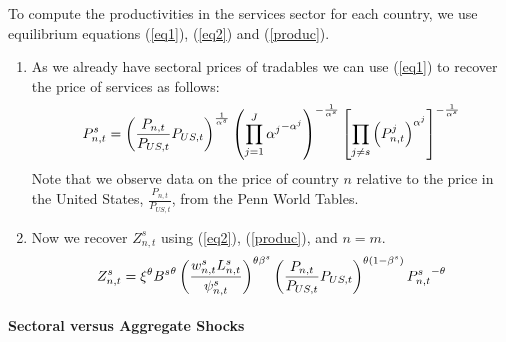 \documentclass[12pt]{article}
\begin{document}
To compute the productivities in the services sector for each country, we
use equilibrium equations (\ref{eq1}), (\ref{eq2}) and (\ref{produc}).

\begin{enumerate}
\item As we already have sectoral prices of tradables we can use (\ref{eq1})
to recover the price of services as follows: 
\begin{equation}
P_{n,t}^{s}=\left( \frac{P_{n,t}}{P_{US,t}}P_{US,t}\right) ^{\frac{1}{\alpha
^{s}}}\left( \prod_{j=1}^{J}{\alpha ^{j}}^{-\alpha ^{j}}\right) ^{-\frac{1}{%
\alpha ^{s}}}\left[ \prod_{j\neq s}\left( P_{n,t}^{j}\right) ^{\alpha ^{j}}%
\right] ^{-\frac{1}{\alpha ^{s}}}
\end{equation}%
Note that we observe data on the price of country $n$ relative to the price
in the United States, $\frac{P_{n,t}}{P_{US,t}}$, from the Penn World Tables.

\item Now we recover $Z_{n,t}^{s}$ using (\ref{eq2}), (\ref{produc}), and $%
n=m$. 
\begin{equation}
Z_{n,t}^{s}=\xi ^{\theta }{B^{s}}^{\theta }\left( \frac{%
w_{n,t}^{s}L_{n,t}^{s}}{\psi _{n,t}^{s}}\right) ^{\theta \beta ^{s}}\left( 
\frac{P_{n,t}}{P_{US,t}}P_{US,t}\right) ^{\theta (1-\beta ^{s})}{P_{n,t}^{s}}%
^{-\theta }
\end{equation}
\end{enumerate}

\paragraph{Sectoral versus Aggregate Shocks}
\end{document}
